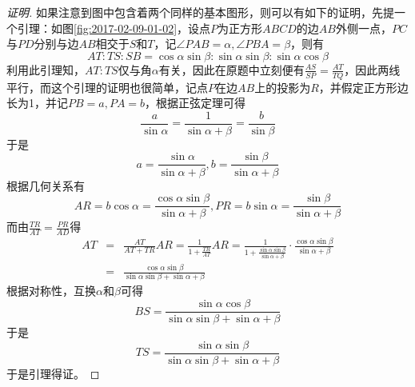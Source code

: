\begin{proof}[证明]
  如果注意到图中包含着两个同样的基本图形，则可以有如下的证明，先提一个引理：如图\ref{fig:2017-02-09-01-02}，设点$P$为正方形$ABCD$的边$AB$外侧一点，$PC$与$PD$分别与边$AB$相交于$S$和$T$，记$\angle PAB=\alpha, \angle PBA=\beta$，则有
  \begin{equation*}
    AT : TS : SB = \cos{\alpha}\sin{\beta} : \sin{\alpha}\sin{\beta} : \sin{\alpha}\cos{\beta}
  \end{equation*}
  利用此引理知，$AT:TS$仅与角$\alpha$有关，因此在原题中立刻便有$\frac{AS}{SP}=\frac{AT}{TQ}$，因此两线平行，而这个引理的证明也很简单，记点$P$在边$AB$上的投影为$R$，并假定正方形边长为1，并记$PB=a, PA=b$，根据正弦定理可得 
  \begin{equation*}
    \frac{a}{\sin{\alpha}}=\frac{1}{\sin{\alpha+\beta}}=\frac{b}{\sin{\beta}}
  \end{equation*}
  于是
  \begin{equation*}
    a=\frac{\sin{\alpha}}{\sin{\alpha+\beta}}, b=\frac{\sin{\beta}}{\sin{\alpha+\beta}}
  \end{equation*}
  根据几何关系有
  \begin{equation*}
    AR=b\cos{\alpha}=\frac{\cos{\alpha}\sin{\beta}}{\sin{\alpha+\beta}}, PR=b\sin{\alpha}=\frac{\sin{\beta}}{\sin{\alpha+\beta}}
  \end{equation*}
  而由$\frac{TR}{AT}=\frac{PR}{AD}$得
  \begin{eqnarray*}
    AT &=& \frac{AT}{AT+TR}AR=\frac{1}{1+\frac{TR}{AT}}AR 
    = \frac{1}{1+\frac{\sin{\alpha}\sin{\beta}}{\sin{\alpha+\beta}}} \cdot \frac{\cos{\alpha}\sin{\beta}}{\sin{\alpha+\beta}} \\
    &=& \frac{\cos{\alpha}\sin{\beta}}{\sin{\alpha}\sin{\beta}+\sin{\alpha+\beta}}
  \end{eqnarray*}
  根据对称性，互换$\alpha$和$\beta$可得
  \begin{equation*}
    BS = \frac{\sin{\alpha}\cos{\beta}}{\sin{\alpha}\sin{\beta}+\sin{\alpha+\beta}}
  \end{equation*}
  于是
  \begin{equation*}
    TS = \frac{\sin{\alpha}\sin{\beta}}{\sin{\alpha}\sin{\beta}+\sin{\alpha+\beta}}
  \end{equation*}
  于是引理得证。
\end{proof}

